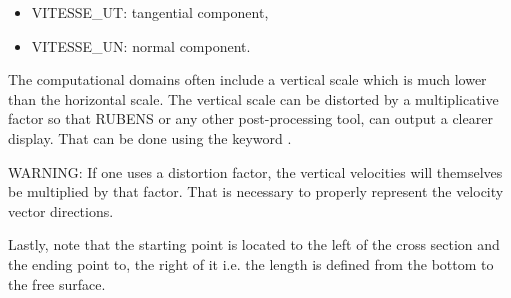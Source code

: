 \begin{itemize}
\item VITESSE\_UT: tangential component,
\item VITESSE\_UN: normal component.
\end{itemize}

The  computational domains often include a vertical scale which is
much lower than the horizontal scale. The vertical scale can be distorted by a
multiplicative factor so that RUBENS or any other post-processing tool, can
output a clearer display. That can be done using the keyword .

WARNING: If one uses a distortion factor, the vertical velocities will
themselves be multiplied by that factor. That is necessary to properly
represent the velocity vector directions.

Lastly, note that the starting point is located to the left of the cross
section and the ending point to, the right of it i.e. the length is defined
from the bottom to the free surface.
